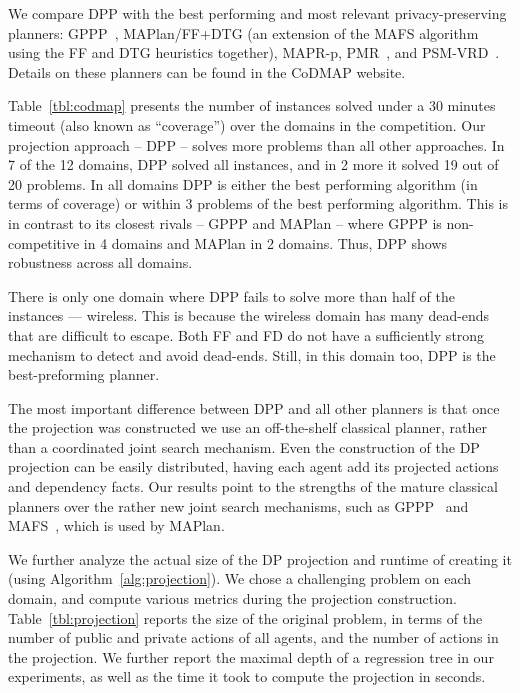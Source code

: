\documentclass[letterpaper]{article}
\theoremstyle{definition}
\begin{document}
We compare DPP with the best performing and most relevant privacy-preserving planners: GPPP~\cite{maliah2015privacy}, MAPlan/FF+DTG (an extension of the MAFS algorithm~\cite{nissim2014distributed} using the FF and DTG heuristics together), MAPR-p, PMR~\cite{luis2014planMerging}, and PSM-VRD~\cite{tovzivcka2014generating,jakubuv2015multiagent}. Details on these planners can be found in the CoDMAP website.

Table~\ref{tbl:codmap} presents the number of instances solved under a 30 minutes timeout (also known as ``coverage'') over the domains in the competition. Our projection approach -- DPP -- solves more problems than all other approaches. In 7 of the 12 domains, DPP solved all instances, and in 2 more it solved 19 out of 20 problems. In all domains DPP is either the best performing algorithm (in terms of coverage) or within 3 problems of the best performing algorithm. This is in contrast to its closest rivals -- GPPP and MAPlan -- where GPPP is non-competitive in 4 domains and MAPlan in 2 domains. Thus, DPP shows robustness across all domains. 


There is only one domain where DPP fails to solve more than half of the instances --- wireless. This is because the wireless domain has many dead-ends that are difficult to escape. Both FF and FD do not have a sufficiently strong mechanism to detect and avoid dead-ends. Still, in this domain too, DPP is the best-preforming planner.

The most important difference between DPP and all other planners is that once the projection was constructed we use an off-the-shelf classical planner, rather than a coordinated joint search mechanism. Even the construction of the DP projection can be easily distributed, having each agent add its projected actions and dependency facts. 
Our results point to the strengths of the mature classical planners over the rather new joint search mechanisms, such as GPPP~\cite{maliah2014privacyPreserving} and MAFS~\cite{nissim2014distributed}, which is used by MAPlan.


We further analyze the actual size of the DP projection and runtime of creating it (using Algorithm~\ref{alg:projection}). We chose a challenging problem on each domain, and compute various metrics during the projection construction.  Table~\ref{tbl:projection} reports the size of the original problem, in terms of the number of public and private actions of all agents, and the number of actions in the projection. We further report the maximal depth of a regression tree in our experiments, as well as the time it took to compute the projection in seconds. 
\end{document}

